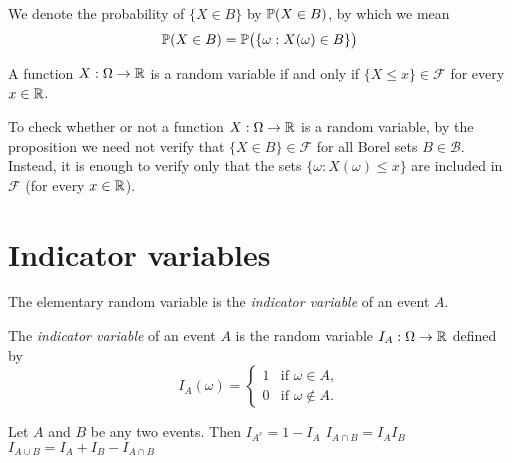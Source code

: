 We denote the probability of $\{X\in B\}$ by $\mathbb{P}(X\in B)$, by which we mean
\[
\mathbb{P}(X\in B) = \mathbb{P}\big(\{\omega: X(\omega) \in B\}\big)
\]

\newpage

\begin{proposition}\label{prop:rv_alt}
A function $X:\Omega\to\mathbb{R}$ is a random variable if and only if $\{X\leq x\}\in\mathcal{F}$ for every $x\in\mathbb{R}$.
\end{proposition}

\proofomitted

\begin{remark}
To check whether or not a function $X:\Omega\to\mathbb{R}$ is a random variable, by the proposition we need not verify that $\{X\in B\}\in\mathcal{F}$ for all Borel sets $B\in\mathcal{B}$. Instead, it is enough to verify only that the sets $\{\omega: X(\omega)\leq x\}$ are included in $\mathcal{F}$ (for every $x\in\mathbb{R}$).
\end{remark}



\section{Indicator variables}
The elementary random variable is the \emph{indicator variable} of an event $A$.

\begin{definition}
The \emph{indicator variable} of an event $A$ is the random variable $I_A:\Omega\to\mathbb{R}$ defined by
\[
I_A(\omega) =
  \begin{cases}
   1 & \text{if } \omega\in A, \\
   0 & \text{if } \omega\notin A.
  \end{cases}
\]
\end{definition}

\begin{theorem}
Let $A$ and $B$ be any two events. Then
\ben
\it $I_{A^c} = 1 - I_A$
\it $I_{A\cap B} = I_A I_B$
\it $I_{A\cup B} = I_A + I_B - I_{A\cap B}$
\een
\end{theorem}

